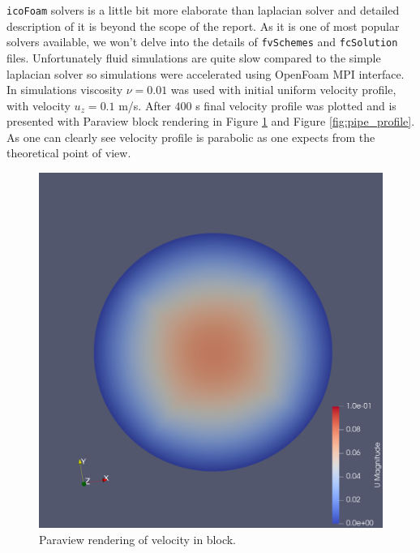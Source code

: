 \documentclass{article}
\begin{document}
\texttt{icoFoam} solvers is a little bit more elaborate than laplacian solver and detailed description of it is beyond the scope of the report.
As it is one of most popular solvers available, we won't delve into the details of \texttt{fvSchemes} and \texttt{fcSolution} files.
Unfortunately fluid simulations are quite slow compared to the simple laplacian solver so simulations were accelerated using OpenFoam MPI interface. 
In simulations viscosity $\nu = 0.01$ was used with initial uniform velocity profile, with velocity $u_z = 0.1$ m/s. After $400$ s 
final velocity profile was plotted and is presented with Paraview block rendering in Figure \ref{fig:pipe_block} and Figure \ref{fig:pipe_profile}.
As one can clearly see velocity profile is parabolic as one expects from the theoretical point of view.
\begin{figure}[!tbp]
    \centering
    \begin{minipage}[b]{0.45\textwidth}
      \includegraphics[width=\textwidth]{block.png}
      \caption{Paraview rendering of velocity in block.}
      \label{fig:pipe_block}
    \end{minipage}
    \hfill
    \begin{minipage}[b]{0.45\textwidth}

\end{minipage}
\end{figure}
\end{document}
